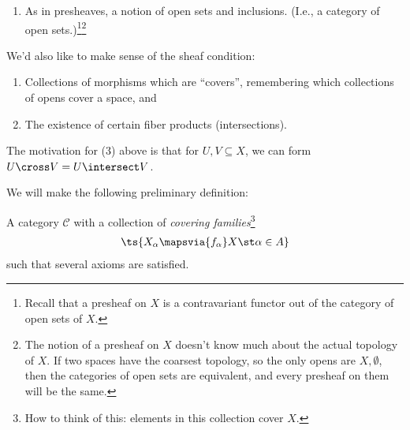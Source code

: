 \begin{answer}

\envlist

\begin{enumerate}
\def\labelenumi{\arabic{enumi}.}
\tightlist
\item
  As in presheaves, a notion of open sets and inclusions. (I.e., a
  category of open sets.)\footnote{Recall that a presheaf on \(X\) is a
    contravariant functor out of the category of open sets of \(X\).}\footnote{The
    notion of a presheaf on \(X\) doesn't know much about the actual
    topology of \(X\). If two spaces have the coarsest topology, so the
    only opens are \(X, \emptyset\), then the categories of open sets
    are equivalent, and every presheaf on them will be the same.}
\end{enumerate}

We'd also like to make sense of the sheaf condition:

\begin{enumerate}
\def\labelenumi{\arabic{enumi}.}
\setcounter{enumi}{1}
\item
  Collections of morphisms which are ``covers'', remembering which
  collections of opens cover a space, and
\item
  The existence of certain fiber products (intersections).
\end{enumerate}

\end{answer}

\begin{remark}

The motivation for (3) above is that for \(U, V \subseteq X\), we can
form \(U\cross V = U\intersect V\).

\end{remark}

We will make the following preliminary definition:

\begin{definition}\label{def:site}

A category \(\mathcal{C}\) with a collection of \emph{covering
families}\footnote{How to think of this: elements in this collection
  cover \(X\).}
\begin{align*}
\ts{X_\alpha \mapsvia{f_\alpha} X \st \alpha\in A}
\end{align*} such that several axioms are satisfied.

\end{definition}

